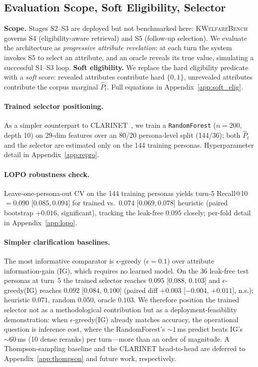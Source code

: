 \documentclass{article}
\newcommand{\kwbench}{\textsc{KWelfareBench}}
\begin{document}
\subsection{Evaluation Scope, Soft Eligibility, Selector}
\label{sec:conv:scope}

\textbf{Scope.} Stages S2--S3 are deployed but not benchmarked here:
\kwbench{} governs S4 (eligibility-aware retrieval) and S5
(follow-up selection). We evaluate the architecture as
\emph{progressive attribute revelation}: at each turn the system
invokes S5 to select an attribute, and an oracle reveals its true
value, simulating a successful S1--S3 loop.
\textbf{Soft eligibility.}
We replace the hard eligibility predicate with a \emph{soft}
score: revealed attributes contribute hard $\{0,1\}$, unrevealed
attributes contribute the corpus marginal $\hat{P}_t$. Full
equations in Appendix~\ref{app:soft_elig}.
\paragraph{Trained selector positioning.}
As a simpler counterpart to
\textsc{CLARINET}~\citep{andukuri2024clarinet}, we train a
\texttt{RandomForest} ($n{=}200$, depth 10) on 29-dim features
over an 80/20 persona-level split (144/36); both $\hat{P}_t$ and
the selector are estimated only on the 144 training personas.
Hyperparameter detail in Appendix~\ref{app:repro}.

\paragraph{LOPO robustness check.}
Leave-one-persona-out CV on the 144 training personas yields
turn-5 Recall@10 $= 0.090$ [$0.085, 0.094$] for trained vs.\
$0.074$ [$0.069, 0.078$] heuristic (paired bootstrap $+0.016$,
significant), tracking the leak-free $0.095$ closely; per-fold
detail in Appendix~\ref{app:lopo}.

\paragraph{Simpler clarification baselines.}
The most informative comparator is $\epsilon$-greedy
($\epsilon{=}0.1$) over attribute information-gain (IG), which
requires no learned model. On the 36 leak-free test personas at
turn~5 the trained selector reaches $0.095$ [$0.088$, $0.103$] and
$\epsilon$-greedy(IG) reaches $0.092$ [$0.084$, $0.100$] (paired
diff $+0.003$ [$-0.004$, $+0.011$], n.s.); heuristic $0.071$, random
$0.050$, oracle $0.103$. We therefore position the trained selector
not as a methodological contribution but as a
deployment-feasibility demonstration: when $\epsilon$-greedy(IG)
already matches accuracy, the operational question is inference
cost, where the RandomForest's ${\sim}1$\,ms predict beats IG's
${\sim}60$\,ms (10 dense reranks) per turn---more than an order of
magnitude. A Thompson-sampling baseline and
the CLARINET head-to-head are deferred to
Appendix~\ref{app:thompson} and future work, respectively.
\end{document}
